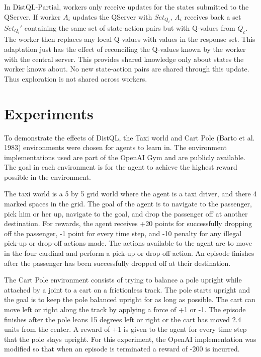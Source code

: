 \documentclass[jair,twoside,11pt,theapa]{article}
\begin{document}
In DistQL-Partial, workers only receive updates for the states submitted to the QServer. If worker $A_i$ updates the QServer with $Set_{Q_i}$, $A_i$ receives back a set $Set_{Q_i}'$ containing the same set of state-action pairs but with Q-values from $Q_c$. The worker then replaces any local Q-values with values in the response set. This adaptation just has the effect of reconciling the Q-values known by the worker with the central server. This provides shared knowledge only about states the worker knows about. No new state-action pairs are shared through this update. Thus exploration is not shared across workers. 



\section{Experiments}
\label{experiments}
To demonstrate the effects of DistQL, the Taxi world \cite{Dietterich2000} and Cart Pole (Barto et al. 1983)\nocite{Barto83} environments were chosen for agents to learn in. The environment implementations used are part of the OpenAI Gym \nocite{gym} and are publicly available. The goal in each environment is for the agent to achieve the highest reward possible in the environment. 

The taxi world is a 5 by 5 grid world where the agent is a taxi driver, and there 4 marked spaces in the grid. The goal of the agent is to navigate to the passenger, pick him or her up, navigate to the goal, and drop the passenger off at another destination. For rewards, the agent receives +20 points for successfully dropping off the passenger, -1 point for every time step, and -10 penalty for any illegal pick-up or drop-off actions made. The actions available to the agent are to move in the four cardinal and perform a pick-up or drop-off action. An episode finishes after the passenger has been successfully dropped off at their destination.

The Cart Pole environment consists of trying to balance a pole upright while attached by a joint to a cart on a frictionless track. The pole starts upright and the goal is to keep the pole balanced upright for as long as possible. The cart can move left or right along the track by applying a force of +1 or -1. The episode finishes after the pole leans 15 degrees left or right or the cart has moved 2.4 units from the center. A reward of +1 is given to the agent for every time step that the pole stays upright. For this experiment, the OpenAI implementation was modified so that when an episode is terminated a reward of -200 is incurred. 
\end{document}
